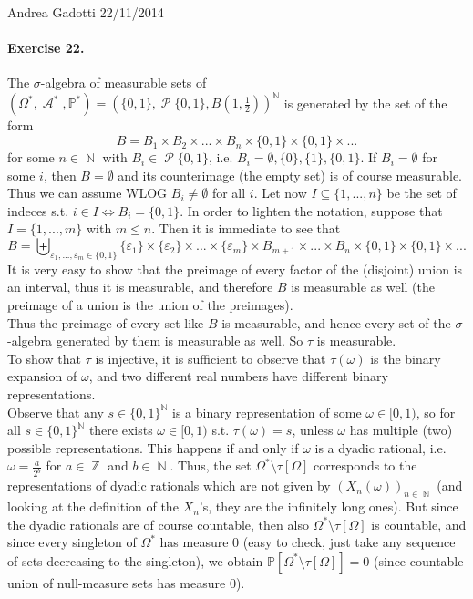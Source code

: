\documentclass[12pt,a4paper]{report}
\theoremstyle{definition}
\theoremstyle{num.custom-title}
\DeclareMathOperator{\A}{\mathcal{A}}
\DeclareMathOperator{\PP}{\mathcal{P}}
\DeclareMathOperator{\N}{\mathbb{N}}
\DeclareMathOperator{\Z}{\mathbb{Z}}
\DeclareMathOperator{\sm}{\setminus}
\DeclareMathOperator{\sse}{\subseteq}
\renewcommand{\P}{\mathbb{P}}
\renewcommand{\1}{\mathbbm{1}}
\renewcommand{\epsilon}{\varepsilon}
\begin{document}
\noindent Andrea Gadotti \hfill 22/11/2014

\paragraph{Exercise 22.} The $\sigma$-algebra of measurable sets of $(\Omega^*, \A^*, \P^*)=\left( \{0,1\}, \PP\{0,1\}, B(1,\frac{1}{2}) \right)^{\N}$ is generated by the set of the form 
\[
B=B_1 \times B_2 \times ... \times B_n \times \{0,1\} \times \{0,1\} \times ... 
\]
for some $n \in \N$ with $B_i \in \PP\{0,1\}$, i.e. $B_i=\emptyset, \{0\} ,\{1\}, \{0,1\}$. If $B_i=\emptyset$ for some $i$, then $B=\emptyset$ and its counterimage (the empty set) is of course measurable. Thus we can assume WLOG $B_i \neq \emptyset$ for all $i$. Let now $I \sse \{1,...,n\}$ be the set of indeces s.t. $i \in I \iff B_i=\{0,1\}$. In order to lighten the notation, suppose that $I=\{1,...,m\}$ with $m \leq n$. Then it is immediate to see that
\[
B= \biguplus_{\epsilon_1,...,\epsilon_m \in \{0,1\}} \{\epsilon_1\} \times \{\epsilon_2\} \times ... \times \{\epsilon_m\} \times B_{m+1} \times ... \times B_n \times \{0,1\} \times \{0,1\} \times ... 
\]
It is very easy to show that the preimage of every factor of the (disjoint) union is an interval, thus it is measurable, and therefore $B$ is measurable as well (the preimage of a union is the union of the preimages).\\
Thus the preimage of every set like $B$ is measurable, and hence every set of the $\sigma$-algebra generated by them is measurable as well. So $\tau$ is measurable.\\
To show that $\tau$ is injective, it is sufficient to observe that $\tau(\omega)$ is the binary expansion of $\omega$, and two different real numbers have different binary representations.\\
Observe that any $s \in \{0,1\}^{\N}$ is a binary representation of some $\omega \in [0,1)$, so for all $s \in \{0,1\}^{\N}$ there exists $\omega \in [0,1)$ s.t. $\tau(\omega)=s$, unless $\omega$ has multiple (two) possible representations. This happens if and only if $\omega$ is a dyadic rational, i.e. $\omega = \frac{a}{2^b}$ for $a \in \Z$ and $b \in \N$. Thus, the set $\Omega^* \sm \tau[\Omega]$ corresponds to the representations of dyadic rationals which are not given by $(X_n(\omega))_{n \in \N}$ (and looking at the definition of the $X_n$'s, they are the infinitely long ones). But since the dyadic rationals are of course countable, then also $\Omega^* \sm \tau[\Omega]$ is countable, and since every singleton of $\Omega^*$ has measure $0$ (easy to check, just take any sequence of sets decreasing to the singleton), we obtain $\P[\Omega^* \sm \tau[\Omega]]=0$ (since countable union of null-measure sets has measure $0$).\\
\end{document}
